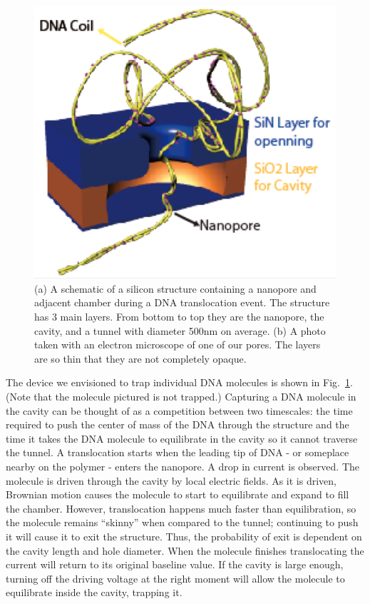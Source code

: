 \documentclass[aps,prl,preprint,groupedaddress]{revtex4}
\begin{document}
\begin{figure}[ht]
\centering
\includegraphics[width=1\textwidth]{figures/nanopore-schematic}
\caption{(a) A schematic of a silicon structure containing a nanopore and adjacent chamber during a DNA translocation event.
The structure has 3 main layers.
From bottom to top they are the nanopore, the cavity, and a tunnel with diameter 500nm on average.
(b) A photo taken with an electron microscope of one of our pores.
The layers are so thin that they are not completely opaque.}
\label{fig:nanopore-schematic}
\end{figure}

The device we envisioned to trap individual DNA molecules is shown in Fig.~\ref{fig:nanopore-schematic}.
(Note that the molecule pictured is not trapped.) Capturing a DNA molecule in the cavity can be thought of as a competition between two timescales: the time required to push the center of mass of the DNA through the structure and the time it takes the DNA molecule to equilibrate in the cavity so it cannot traverse the tunnel.
A translocation starts when the leading tip of DNA  - or someplace nearby on the polymer - enters the nanopore.
A drop in current is observed.
The molecule is driven through the cavity by local electric fields.
As it is driven, Brownian motion causes the molecule to start to equilibrate and expand to fill the chamber.
However, translocation happens much faster than equilibration, so the molecule remains ``skinny'' when compared to the tunnel; continuing to push it will cause it to exit the structure.
Thus, the probability of exit is dependent on the cavity length and hole diameter.
When the molecule finishes translocating the current will return to its original baseline value.
If the cavity is large enough, turning off the driving voltage at the right moment will allow the molecule to equilibrate inside the cavity, trapping it.
\end{document}
